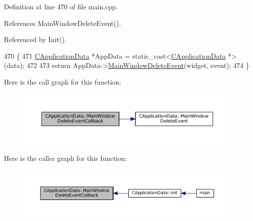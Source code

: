 Definition at line 470 of file main.\+cpp.



References Main\+Window\+Delete\+Event().



Referenced by Init().


\begin{DoxyCode}
470                                                                                                          \{
471     \hyperlink{classCApplicationData}{CApplicationData} *AppData = \textcolor{keyword}{static\_cast<}\hyperlink{classCApplicationData}{CApplicationData} *\textcolor{keyword}{>}(data);
472 
473     \textcolor{keywordflow}{return} AppData->\hyperlink{classCApplicationData_afd73780d7dca117edbe341cb3c908c04}{MainWindowDeleteEvent}(widget, event);
474 \}
\end{DoxyCode}
Here is the call graph for this function\+:\nopagebreak
\begin{figure}[H]
\begin{center}
\leavevmode
\includegraphics[width=350pt]{classCApplicationData_a4b2110c03e030cf11b733955963f8854_cgraph}
\end{center}
\end{figure}
Here is the caller graph for this function\+:\nopagebreak
\begin{figure}[H]
\begin{center}
\leavevmode
\includegraphics[width=350pt]{classCApplicationData_a4b2110c03e030cf11b733955963f8854_icgraph}
\end{center}
\end{figure}
\hypertarget{classCApplicationData_a202437b2380956a5519722937cd9f96a}{}\label{classCApplicationData_a202437b2380956a5519722937cd9f96a} 
